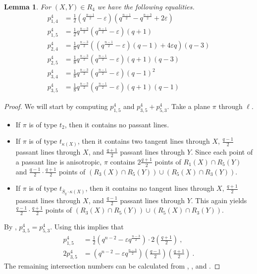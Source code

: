 \documentclass[a4paper]{article}
\newtheorem{lm}[thm]{Lemma}
\theoremstyle{definition}
\newcommand{\eps}{\varepsilon}
\newcommand{\ns}{\overline S}
\begin{document}
\begin{lm}
    For $(X,Y)\in R_{4}$ we have the following equalities.
    {\allowdisplaybreaks \begin{align*}
        p^{4}_{1,4}&=\frac{1}{2}\left(q^{\frac{n-1}{2}}-\eps\right)\left(q^{\frac{n-1}{2}}-q^{\frac{n-3}{2}}+2\eps\right)\\
        p^{4}_{1,5}&=\frac{1}{2}q^{\frac{n-3}{2}}\left(q^{\frac{n-1}{2}}-\eps \right)\left(q+1\right)\\
        p^{4}_{2,4} &= \frac{1}{8}q^{\frac{n-3}{2}}\left( \left(q^{\frac{n-1}{2}}-\eps\right)(q-1) + 4\eps q\right)\left(q-3\right)\\
        p^{4}_{2,5}&=\frac{1}{8}q^{\frac{n-3}{2}}\left(q^{\frac{n-1}{2}}-\eps \right)\left(q+1\right)\left(q-3\right)\\
        p^{4}_{3,4}&=\frac{1}{8}q^{\frac{n-3}{2}}\left(q^{\frac{n-1}{2}}-\eps \right)\left(q-1\right)^{2}\\
        p^{4}_{3,5}&=\frac{1}{8}q^{\frac{n-3}{2}}\left(q^{\frac{n-1}{2}}-\eps \right)\left(q+1\right)\left(q-1\right)
    \end{align*}}
\end{lm}

\begin{proof}
 We will start by computing $p^4_{1,5}$ and $p^4_{3,5} + p^4_{5,3}$.
 Take a plane $\pi$ through $\ell$.
 \begin{itemize}
  \item If $\pi$ is of type $t_2$, then it contains no passant lines.
  \item If $\pi$ is of type $t_{\kappa(X)}$, then it contains two tangent lines through $X$, $\frac{q-1}2$ passant lines through $X$, and $\frac{q+1}2$ passant lines through $Y$.
  Since each point of a passant line is anisotropic, $\pi$ contains $2 \frac{q+1}2$ points of $R_1(X) \cap R_5(Y)$ and $\frac{q-1}2 \cdot\frac{q+1}2$ points of $(R_3(X) \cap R_5(Y)) \cup (R_5(X) \cap R_3(Y))$.
  \item If $\pi$ is of type $t_{\ns_q \cdot \kappa(X)}$, then it contains no tangent lines through $X$, $\frac{q+1}2$ passant lines through $X$, and $\frac{q-1}2$ passant lines through $Y$.
  This again yields $\frac{q-1}2 \cdot\frac{q+1}2$ points of $(R_3(X) \cap R_5(Y)) \cup (R_5(X) \cap R_3(Y))$.
 \end{itemize}
 By , $p^4_{3,5} = p^4_{5,3}$.
 Using  this implies that
 \begin{align*}
  p^{4}_{1,5} &= \frac{1}{2}\left( q^{n-2}-\eps q^{\frac{n-3}{2}} \right) \cdot2 \left( \frac{q+1}{2} \right )\:,\\
  2p^{4}_{3,5} &= \left( q^{n-2}-\eps q^{\frac{n-3}{2}} \right) \left( \frac{q-1}{2} \right) \left( \frac{q+1}{2} \right) \:.
 \end{align*}
 The remaining intersection numbers can be calculated from , , and .
\end{proof}
\end{document}
